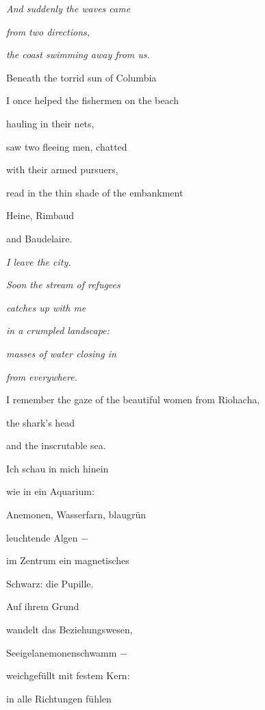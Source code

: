 \emph{
And suddenly the waves came}

\emph{
from two directions,}

\emph{
the coast swimming away from us.}


\bigskip

Beneath the torrid sun of Columbia

I once helped the fishermen on the beach 

hauling in their nets,


\bigskip

saw two fleeing men, chatted

with their armed pursuers,


\bigskip

read in the thin shade of the embankment

Heine, Rimbaud

and Baudelaire.


\bigskip

\emph{
I leave the city.}

\emph{
Soon the stream of refugees}

\emph{
catches up with me}

\emph{
in a crumpled landscape:}

\emph{
masses of water closing in}

\emph{
from everywhere.}


\bigskip

I remember the gaze of the beautiful women from Riohacha,

the shark's head

and the inscrutable sea.


\bigskip



\bigskip

Ich schau in mich hinein

wie in ein Aquarium:

Anemonen, Wasserfarn, blaugrün

leuchtende Algen $-$

im Zentrum ein magnetisches 

Schwarz: die Pupille.


\bigskip

Auf ihrem Grund

wandelt das Beziehungswesen,

Seeigelanemonenschwamm $-$

weichgefüllt mit festem Kern:

in alle Richtungen fühlen


